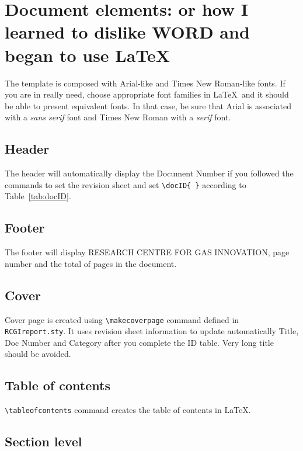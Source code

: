 \section{Document elements: or how I learned to dislike WORD and began to use \LaTeX}

The template is composed with Arial-like and Times New Roman-like fonts. If you are in really need, choose appropriate font families in \LaTeX\ and it should be able to present equivalent fonts. In that case, be sure that Arial is associated with a \emph{sans serif} font and Times New Roman with a \emph{serif} font.

\subsection{Header}

The header will automatically display the Document Number if you followed the commands to set the revision sheet and set \verb+\docID{ }+ according to Table~\ref{tab:docID}.

\subsection{Footer}

The footer will display RESEARCH CENTRE FOR GAS INNOVATION, page number and the total of pages in the document.

\subsection{Cover}

Cover page is created using \verb+\makecoverpage+ command defined in \verb+RCGIreport.sty+. It uses revision sheet information to update automatically Title, Doc Number and Category  after you complete the ID table. Very long title  should be avoided.

\subsection{Table of contents}

\verb+\tableofcontents+ command creates the table of contents in \LaTeX.

\subsection{Section level}

